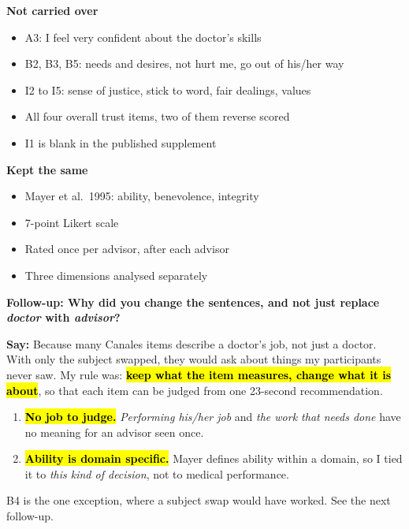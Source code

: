 \documentclass[11pt,a4paper]{article}
\newcommand{\key}[1]{\hl{#1}}
\newcommand{\say}[1]{\begin{tcolorbox}[colback=knlight,colframe=knblue,boxrule=0.5pt,left=6pt,right=6pt,top=4pt,bottom=4pt]\textbf{Say:} #1\end{tcolorbox}}
\begin{document}
\vspace{0.4em}
\begin{minipage}[t]{0.48\textwidth}
\textbf{Not carried over}
\begin{itemize}
  \item A3: I feel very confident about the doctor's skills
  \item B2, B3, B5: needs and desires, not hurt me, go out of his/her way
  \item I2 to I5: sense of justice, stick to word, fair dealings, values
  \item All four overall trust items, two of them reverse scored
  \item I1 is blank in the published supplement
\end{itemize}
\end{minipage}\hfill
\begin{minipage}[t]{0.48\textwidth}
\textbf{Kept the same}
\begin{itemize}
  \item Mayer et al.\ 1995: ability, benevolence, integrity
  \item 7-point Likert scale
  \item Rated once per advisor, after each advisor
  \item Three dimensions analysed separately
\end{itemize}
\end{minipage}
\par\vspace{0.9em}

{\bfseries\color{knblue}Follow-up: Why did you change the sentences, and not just replace \emph{doctor} with \emph{advisor}?}\par\vspace{0.2em}

\say{Because many Canales items describe a doctor's job, not just a doctor. With only the subject swapped, they would ask about things my participants never saw. My rule was: \key{\textbf{keep what the item measures, change what it is about}}, so that each item can be judged from one 23-second recommendation.
\begin{enumerate}[leftmargin=1.4em,itemsep=0.1em,topsep=0.2em]
  \item \key{\textbf{No job to judge.}} \emph{Performing his/her job} and \emph{the work that needs done} have no meaning for an advisor seen once.
  \item \key{\textbf{Ability is domain specific.}} Mayer defines ability within a domain, so I tied it to \emph{this kind of decision}, not to medical performance.
\end{enumerate}
B4 is the one exception, where a subject swap would have worked. See the next follow-up.}
\end{document}
